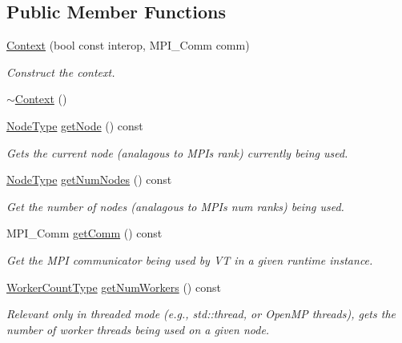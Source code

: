 \subsection*{Public Member Functions}
\begin{DoxyCompactItemize}
\item 
\hyperlink{structvt_1_1ctx_1_1_context_aa00297fe6a9bde8202b4099ede6069fc}{Context} (bool const interop, M\+P\+I\+\_\+\+Comm comm)
\begin{DoxyCompactList}\small\item\em Construct the context. \end{DoxyCompactList}\item 
\hyperlink{structvt_1_1ctx_1_1_context_aa916f841807f2a1b913df33f782715af}{$\sim$\+Context} ()
\item 
\hyperlink{namespacevt_a866da9d0efc19c0a1ce79e9e492f47e2}{Node\+Type} \hyperlink{structvt_1_1ctx_1_1_context_a0d52c263ce8516546a67443d9a86fa5f}{get\+Node} () const
\begin{DoxyCompactList}\small\item\em Gets the current node (analagous to M\+PI\textquotesingle{}s rank) currently being used. \end{DoxyCompactList}\item 
\hyperlink{namespacevt_a866da9d0efc19c0a1ce79e9e492f47e2}{Node\+Type} \hyperlink{structvt_1_1ctx_1_1_context_a7f41071aadf6d5fa9e1b6c703c5ff19d}{get\+Num\+Nodes} () const
\begin{DoxyCompactList}\small\item\em Get the number of nodes (analagous to M\+PI\textquotesingle{}s num ranks) being used. \end{DoxyCompactList}\item 
M\+P\+I\+\_\+\+Comm \hyperlink{structvt_1_1ctx_1_1_context_a2d4378c97824792991a3410449cf19db}{get\+Comm} () const
\begin{DoxyCompactList}\small\item\em Get the M\+PI communicator being used by VT in a given runtime instance. \end{DoxyCompactList}\item 
\hyperlink{namespacevt_aa93398ea48f2cb6c188512250f7cc248}{Worker\+Count\+Type} \hyperlink{structvt_1_1ctx_1_1_context_a0ea881fa8c4d8fee74e85d8a6c52a6f0}{get\+Num\+Workers} () const
\begin{DoxyCompactList}\small\item\em Relevant only in threaded mode (e.\+g., {\ttfamily std\+::thread}, or Open\+MP threads), gets the number of worker threads being used on a given node. \end{DoxyCompactList}\item 

\end{DoxyCompactItemize}
